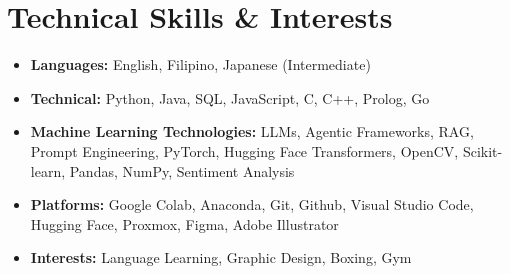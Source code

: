 \documentclass[10.5pt, letterpaper]{article}
\begin{document}
\section{Technical Skills \& Interests}

\begin{itemize}[leftmargin=1.1em]
    \item \textbf{Languages:} English, Filipino, Japanese (Intermediate)
    \item \textbf{Technical:} Python, Java, SQL, JavaScript, C, C++, Prolog, Go
    \item \textbf{Machine Learning Technologies:} LLMs, Agentic Frameworks, RAG, Prompt Engineering, PyTorch, Hugging Face Transformers, OpenCV, Scikit-learn, Pandas, NumPy, Sentiment Analysis
    \item \textbf{Platforms:} Google Colab, Anaconda, Git, Github, Visual Studio Code, Hugging Face, Proxmox, Figma, Adobe Illustrator
    \item \textbf{Interests:} Language Learning, Graphic Design, Boxing, Gym
\end{itemize}
\end{document}
